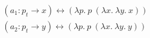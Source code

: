 \[
    \begin{aligned}
        (a_1 : p_t \rightarrow x) \leftrightarrow (\lambda p.\ p\ (\lambda x.\ \lambda y.\ x)) \\
        (a_2 : p_t \rightarrow y) \leftrightarrow (\lambda p.\ p\ (\lambda x.\ \lambda y.\ y))
    \end{aligned}
\]